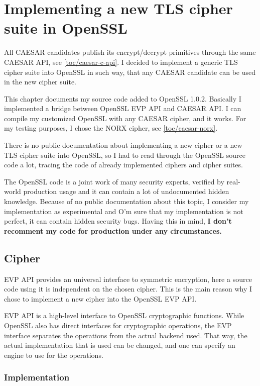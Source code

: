 \chapter{Implementing a new TLS cipher suite in OpenSSL}

All CAESAR candidates publish its encrypt/decrypt primitives through the same CAESAR API, see \autoref{toc/caesar-c-api}. I decided to implement a generic TLS cipher suite into OpenSSL in such way, that any CAESAR candidate can be used in the new cipher suite.

This chapter documents my source code added to OpenSSL 1.0.2. Basically I implemented a bridge between OpenSSL EVP API and CAESAR API. I can compile my customized OpenSSL with any CAESAR cipher, and it works. For my testing purposes, I chose the NORX cipher, see \autoref{toc/caesar-norx}.

There is no public documentation about implementing a new cipher or a new TLS cipher suite into OpenSSL, so I had to read through the OpenSSL source code a lot, tracing the code of already implemented ciphers and cipher suites.

The OpenSSL code is a joint work of many security experts, verified by real-world production usage and it can contain a lot of undocumented hidden knowledge. Because of no public documentation about this topic, I consider my implementation as experimental and O'm sure that my implementation is not perfect, it can contain hidden security bugs. Having this in mind, \textbf{I don't recomment my code for production under any circumstances.}

\section{Cipher}
\label{toc/implementation-cipher}

EVP API provides an universal interface to symmetric encryption, here a source code using it is independent on the chosen cipher. This is the main reason why I chose to implement a new cipher into the OpenSSL EVP API.

EVP API is a high-level interface to OpenSSL cryptographic functions. While OpenSSL also has direct interfaces for cryptographic operations, the EVP interface separates the operations from the actual backend used. That way, the actual implementation that is used can be changed, and one can specify an engine to use for the operations.

\subsection{Implementation}

